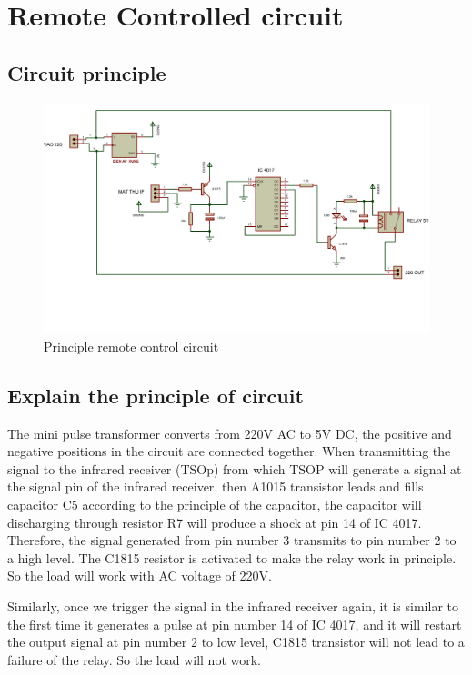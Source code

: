 \documentclass[a4paper]{report}
\begin{document}
    \section{Remote Controlled circuit}
        \subsection{Circuit principle}
            \begin{figure}[ht]
                \centering
                \includegraphics[width=\linewidth]{pic1.png}
                \caption{\label{fig:boat}Principle remote control circuit}
            \end{figure}
        \subsection{Explain the principle of circuit}
            The mini pulse transformer converts from 220V AC to 5V DC, the positive and negative positions in 
            the circuit are connected together. When transmitting the signal to the infrared receiver (TSOp) 
            from which TSOP will generate a signal at the signal pin of the infrared receiver, then A1015 transistor 
            leads and fills capacitor C5 according to the principle of the capacitor, the capacitor will discharging 
            through resistor R7 will produce a shock at pin 14 of IC 4017. Therefore, the signal generated from pin 
            number 3 transmits to pin number 2 to a high level. The C1815 resistor is activated to make the relay 
            work in principle. So the load will work with AC voltage of 220V.
            \linebreak
            \par Similarly, once we trigger the signal in the infrared receiver again, it is similar to the first 
            time it generates a pulse at pin number 14 of IC 4017, and it will restart the output signal at pin number 2 
            to low level, C1815 transistor will not lead to a failure of the relay. So the load will not work.
\end{document}
